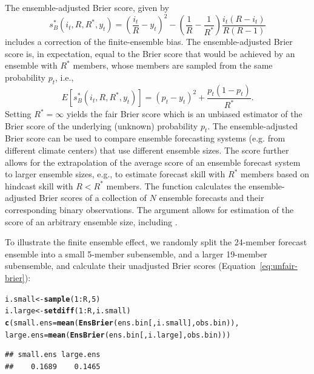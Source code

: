 \documentclass[article]{jss}\usepackage{graphicx, color}
\makeatletter
\newcommand{\hlfunctioncall}[1]{\textcolor[rgb]{0,0.501960784313725,0.752941176470588}{\textbf{#1}}}%
\newenvironment{kframe}{%
 \def\at@end@of@kframe{}%
 \ifinner\ifhmode%
  \def\at@end@of@kframe{\end{minipage}}%
  \begin{minipage}{\columnwidth}%
 \fi\fi%
 \def\FrameCommand##1{\hskip\@totalleftmargin \hskip-\fboxsep
 \colorbox{shadecolor}{##1}\hskip-\fboxsep
     \hskip-\linewidth \hskip-\@totalleftmargin \hskip\columnwidth}%
 \MakeFramed {\advance\hsize-\width
   \@totalleftmargin\z@ \linewidth\hsize
   \@setminipage}}%
 {\par\unskip\endMakeFramed%
 \at@end@of@kframe}
\newenvironment{knitrout}{}{} %
\makeatother
\begin{document}
The ensemble-adjusted Brier score, given by \citep{ferro2008effect}
%
\begin{equation}
s_{B}^*(i_t, R, R^*, y_t) = \left(\frac{i_t}{R} - y_t\right)^2 - \left(\frac{1}{R} - \frac{1}{R^*}\right)\frac{i_t(R-i_t)}{R(R-1)}
\label{eq:ens-brier}
\end{equation}
%
includes a correction of the finite-ensemble bias.
The ensemble-adjusted Brier score is, in expectation, equal to the Brier score that would be achieved by an ensemble with $R^*$ members, whose members are sampled from the same probability $p_t$, i.e., 
%
\begin{equation}
E\left[s_{B}^*(i_t, R, R^*, y_t)\right] = (p_t - y_t)^2 + \frac{p_t(1-p_t)}{R^*}.
\end{equation}
%
Setting $R^*=\infty$ yields the fair Brier score \citep{ferro2013fair} which is an unbiased estimator of the Brier score of the underlying (unknown) probability $p_t$.
The ensemble-adjusted Brier score can be used to compare ensemble forecasting systems (e.g. from different climate centers) that use different ensemble sizes.
The score further allows for the extrapolation of the average score of an ensemble forecast system to larger ensemble sizes, e.g., to estimate forecast skill with $R^*$ members based on hindcast skill with $R<R^*$ members.
The  function  calculates the ensemble-adjusted Brier scores of a collection of $N$ ensemble forecasts and their corresponding binary observations. 
The argument  allows for estimation of the score of an arbitrary ensemble size, including .


To illustrate the finite ensemble effect, we randomly split the 24-member forecast ensemble  into a small 5-member subensemble, and a larger 19-member subensemble, and calculate their unadjusted Brier scores (Equation~\ref{eq:unfair-brier}):
%
\begin{knitrout}
\color{fgcolor}\begin{kframe}
\begin{alltt}
i.small <- \hlfunctioncall{sample}(1:R, 5)
i.large <- \hlfunctioncall{setdiff}(1:R, i.small)
\hlfunctioncall{c}(small.ens=\hlfunctioncall{mean}(\hlfunctioncall{EnsBrier}(ens.bin[, i.small], obs.bin)), 
  large.ens=\hlfunctioncall{mean}(\hlfunctioncall{EnsBrier}(ens.bin[, i.large], obs.bin)))
\end{alltt}
\begin{verbatim}
## small.ens large.ens 
##    0.1689    0.1465
\end{verbatim}
\end{kframe}
\end{knitrout}
\end{document}
